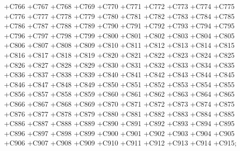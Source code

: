  +C766 +C767 +C768 +C769 +C770 +C771 +C772 +C773 +C774 +C775 +C776 +C777 +C778 +C779 +C780 +C781 +C782
 +C783 +C784 +C785 +C786 +C787 +C788 +C789 +C790 +C791 +C792 +C793 +C794 +C795 +C796 +C797 +C798 +C799
 +C800 +C801 +C802 +C803 +C804 +C805 +C806 +C807 +C808 +C809 +C810 +C811 +C812 +C813 +C814 +C815 +C816
 +C817 +C818 +C819 +C820 +C821 +C822 +C823 +C824 +C825 +C826 +C827 +C828 +C829 +C830 +C831 +C832 +C833
 +C834 +C835 +C836 +C837 +C838 +C839 +C840 +C841 +C842 +C843 +C844 +C845 +C846 +C847 +C848 +C849 +C850
 +C851 +C852 +C853 +C854 +C855 +C856 +C857 +C858 +C859 +C860 +C861 +C862 +C863 +C864 +C865 +C866 +C867
 +C868 +C869 +C870 +C871 +C872 +C873 +C874 +C875 +C876 +C877 +C878 +C879 +C880 +C881 +C882 +C883 +C884
 +C885 +C886 +C887 +C888 +C889 +C890 +C891 +C892 +C893 +C894 +C895 +C896 +C897 +C898 +C899 +C900 +C901
 +C902 +C903 +C904 +C905 +C906 +C907 +C908 +C909 +C910 +C911 +C912 +C913 +C914 +C915; \\

